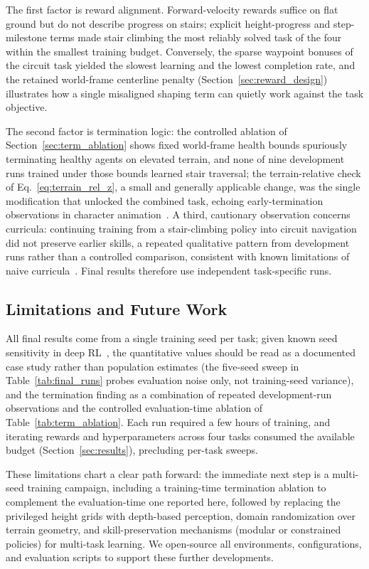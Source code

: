 \documentclass[conference,a4paper]{IEEEtran}
\begin{document}
The first factor is reward alignment. Forward-velocity rewards suffice on flat ground but do not describe progress on stairs; explicit height-progress and step-milestone terms made stair climbing the most reliably solved task of the four within the smallest training budget. Conversely, the sparse waypoint bonuses of the circuit task yielded the slowest learning and the lowest completion rate, and the retained world-frame centerline penalty (Section~\ref{sec:reward_design}) illustrates how a single misaligned shaping term can quietly work against the task objective.

The second factor is termination logic: the controlled ablation of Section~\ref{sec:term_ablation} shows fixed world-frame health bounds spuriously terminating healthy agents on elevated terrain, and none of nine development runs trained under those bounds learned stair traversal; the terrain-relative check of Eq.~\eqref{eq:terrain_rel_z}, a small and generally applicable change, was the single modification that unlocked the combined task, echoing early-termination observations in character animation~\cite{peng2018deepmimic}. A third, cautionary observation concerns curricula: continuing training from a stair-climbing policy into circuit navigation did not preserve earlier skills, a repeated qualitative pattern from development runs rather than a controlled comparison, consistent with known limitations of naive curricula~\cite{bengio2009curriculum}. Final results therefore use independent task-specific runs.

\subsection{Limitations and Future Work}
\label{sec:limitations}
All final results come from a single training seed per task; given known seed sensitivity in deep RL~\cite{henderson2018matters,agarwal2021precipice}, the quantitative values should be read as a documented case study rather than population estimates (the five-seed sweep in Table~\ref{tab:final_runs} probes evaluation noise only, not training-seed variance), and the termination finding as a combination of repeated development-run observations and the controlled evaluation-time ablation of Table~\ref{tab:term_ablation}. Each run required a few hours of training, and iterating rewards and hyperparameters across four tasks consumed the available budget (Section~\ref{sec:results}), precluding per-task sweeps.

These limitations chart a clear path forward: the immediate next step is a multi-seed training campaign, including a training-time termination ablation to complement the evaluation-time one reported here, followed by replacing the privileged height grids with depth-based perception, domain randomization over terrain geometry, and skill-preservation mechanisms (modular or constrained policies) for multi-task learning. We open-source all environments, configurations, and evaluation scripts to support these further developments.



\end{document}
